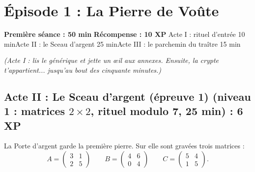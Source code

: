 \documentclass[11pt,a4paper]{article}
\begin{document}
\section*{\textcolor{nuit}{Épisode 1 : La Pierre de Voûte}}
{\small\textbf{Première séance : 50 min}\quad\textbullet\quad
\textbf{Récompense : 10 XP}\quad\textbullet\quad
Acte I : rituel d'entrée 10 min\quad\textbullet\quad Acte II : le Sceau
d'argent 25 min\quad\textbullet\quad Acte III : le parchemin du traître
15 min}

{\small\itshape (Acte I : lis le générique et jette un œil aux annexes.
Ensuite, la crypte t'appartient... jusqu'au bout des cinquante minutes.)}

\subsection*{\textcolor{argent}{Acte II : Le Sceau d'argent (épreuve 1)} \normalsize\textcolor{argent}{(niveau 1 : matrices $2\times 2$, rituel modulo 7, 25 min)} : 6 XP}

La Porte d'argent garde la première pierre. Sur elle sont gravées trois
matrices :
\[
A=\begin{pmatrix}3&1\\2&5\end{pmatrix}\qquad
B=\begin{pmatrix}4&6\\0&4\end{pmatrix}\qquad
C=\begin{pmatrix}5&4\\1&5\end{pmatrix}.
\]
\end{document}
